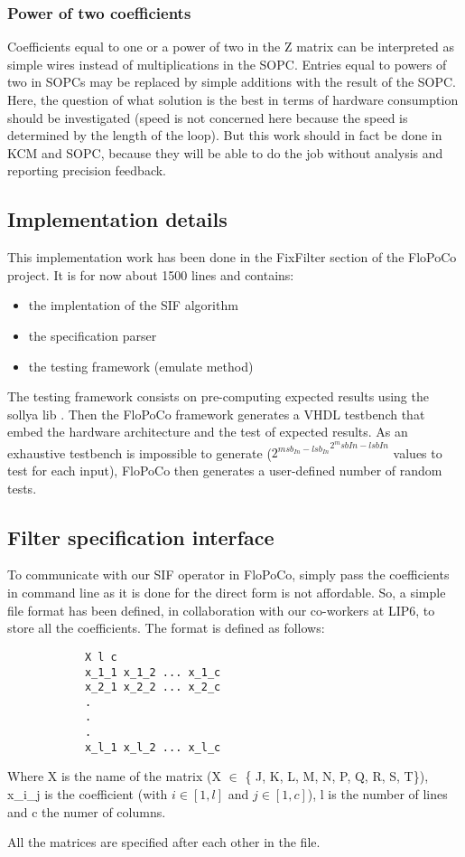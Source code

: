 	\subsubsection{Power of two coefficients}
		Coefficients equal to one or a power of two in the Z matrix can be interpreted as simple wires instead of multiplications in the SOPC.
		Entries equal to powers of two in SOPCs may be replaced by simple additions with the result of the SOPC.
		Here, the question of what solution is the best in terms of hardware consumption should be investigated
		(speed is not concerned here because the speed is determined by the length of the loop).
		But this work should in fact be done in KCM and SOPC, because they will be able to do the job without analysis and reporting precision feedback.

	\subsection{Implementation details}
	This implementation work has been done in the FixFilter section of the FloPoCo project.
	It is for now about 1500 lines and contains:
	\begin{itemize}
		\item the implentation of the SIF algorithm
		\item the specification parser
		\item the testing framework (emulate method)
	\end{itemize}

	The testing framework consists on pre-computing expected results using the sollya lib \cite{ChevillardJoldesLauter2010}.
	Then the FloPoCo framework generates a VHDL testbench that embed the hardware architecture and the test of expected results.
	As an exhaustive testbench is impossible to generate (${2^{msb_{In} - lsb_{In}}}^{2^msb{In} - lsb{In}}$ values to test for each input),
	FloPoCo then generates a user-defined number of random tests.

		\subsection{Filter specification interface}
		To communicate with our SIF operator in FloPoCo, simply pass the coefficients in command line as it is done for the direct form is not affordable.
		So, a simple file format has been defined, in collaboration with our co-workers at LIP6, to store all the coefficients.
		The format is defined as follows:

		\begin{verbatim}
			X l c
			x_1_1 x_1_2 ... x_1_c
			x_2_1 x_2_2 ... x_2_c
			.
			.
			.
			x_l_1 x_l_2 ... x_l_c
		\end{verbatim}

		Where X is the name of the matrix (X $\in$ \{ J, K, L, M, N, P, Q, R, S, T\}), x\_i\_j is the coefficient (with $i \in [1, l]$ and $j \in [1, c]$), l is the number of lines and c the numer of columns.

		All the matrices are specified after each other in the file.




